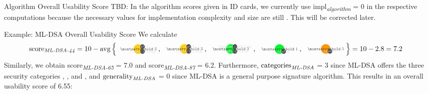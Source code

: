 \begin{algorithmbox}{Algorithm Overall Usability Score}
	\textcolor{themeaccentsecondary}{TBD: In the algorithm scores given in ID cards, we currently use \textnormal{impl\textsubscript{\itshape algorithm}} = 0 in the respective computations because the necessary values for implementation complexity and size are still \tbd. This will be corrected later.}
\end{algorithmbox}
\vspace{-2mm}
\begin{algorithmbox}{Example: ML-DSA Overall Usability Score}
	\tiny
	We calculate
	\vspace{-4mm}
	\begin{align*}
		\textnormal{score\textsubscript{\itshape ML-DSA-44}} &= \textnormal{10} - \avg\left\{{
		\tripleicon{\montserratbold 3}{\faMicrochip}{themeyellow}{0.6}{\faKey}\hspace{-1mm}\textnormal{, } %
		\tripleicon{\montserratbold 3}{\faMicrochip}{themeyellow}{0.6}{\faPen}\hspace{-1mm}\textnormal{, } %
		\tripleicon{\montserratbold 2}{\faMicrochip}{themegreen}{0.6}{\faQuestionCircle}\hspace{-1mm}\textnormal{, } %
		\doubleicon{\montserratbold 1}{\faPen}{themegreen}{0.6}\hspace{-1mm}\textnormal{, } %
		\doubleicon{\montserratbold 5}{\faKey}{themeorange}{0.6}\hspace{-1mm}
		}\right\} = \textnormal{10} - \textnormal{2.8} = \textnormal{7.2}
	\end{align*}
	Similarly, we obtain \textnormal{score\textsubscript{\itshape ML-DSA-65}} = 7.0 and \textnormal{score\textsubscript{\itshape ML-DSA-87}} = 6.2. Furthermore, $\textnormal{categories}_\textnormal{\itshape ML-DSA}$ = 3 since ML-DSA offers the three security categories \hspace{-2mm}, \hspace{-2mm}, and \hspace{-2mm}, and $\textnormal{generality}_\textnormal{\itshape ML-DSA}$ = 0 since ML-DSA is a general purpose signature algorithm. This results in an overall usability score of 6.55:\\[\baselineskip]


\end{algorithmbox}
